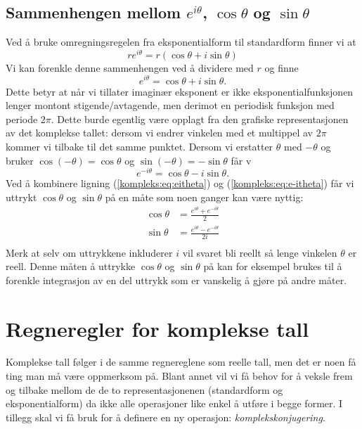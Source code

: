 \documentclass[a4paper,norsk,12pt]{article}
\begin{document}
\subsection{Sammenhengen mellom $e^{i\theta}$, $\cos\theta$ og $\sin\theta$}
Ved å bruke omregningsregelen fra eksponentialform til standardform finner vi at
\begin{displaymath}
	re^{i\theta} = r(\cos\theta + i\sin\theta)
\end{displaymath}
Vi kan forenkle denne sammenhengen ved å dividere med $r$ og finne
\begin{equation}
	\label{kompleks:eq:eitheta}
	e^{i\theta} = \cos\theta + i\sin\theta.
\end{equation}
Dette betyr at når vi tillater imaginær eksponent er ikke eksponentialfunksjonen lenger montont stigende/avtagende, men derimot en periodisk funksjon med periode $2\pi$. Dette burde egentlig være opplagt fra den grafiske representasjonen av det komplekse tallet: dersom vi endrer vinkelen med et multippel av $2\pi$ kommer vi tilbake til det samme punktet. Dersom vi erstatter $\theta$ med $-\theta$ og bruker $\cos(-\theta) = \cos\theta$ og $\sin(-\theta) = -\sin\theta$ får v
\begin{equation}
	\label{kompleks:eq:e-itheta}
	e^{-i\theta} = \cos\theta - i\sin\theta.
\end{equation}
Ved å kombinere ligning (\ref{kompleks:eq:eitheta}) og (\ref{kompleks:eq:e-itheta}) får vi uttrykt $\cos\theta$ og $\sin\theta$ på en måte som noen ganger kan være nyttig:
\begin{align*}
	\cos\theta &= \frac{e^{i\theta}+e^{-i\theta}}{2} \\
	\sin\theta &= \frac{e^{i\theta}-e^{-i\theta}}{2i} \\
\end{align*}
Merk at selv om uttrykkene inkluderer $i$ vil svaret bli reellt så lenge vinkelen $\theta$ er reell. Denne måten å uttrykke $\cos\theta$ og $\sin\theta$ på kan for eksempel brukes til å forenkle integrasjon av en del uttrykk som er vanskelig å gjøre på andre måter.

\section{Regneregler for komplekse tall}
Komplekse tall følger i de samme regnereglene som reelle tall, men det er noen få ting man må være oppmerksom på. Blant annet vil vi få behov for å veksle frem og tilbake mellom de de to representasjonenen (standardform og eksponentialform) da ikke alle operasjoner like enkel å utføre i begge former. I tillegg skal vi få bruk for å definere en ny operasjon: \emph{komplekskonjugering}.
\end{document}
